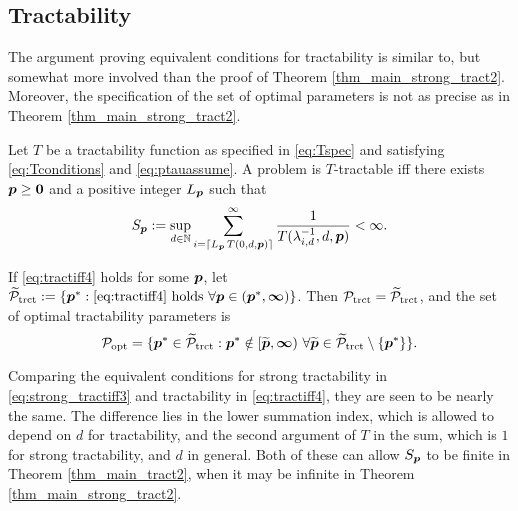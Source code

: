 \documentclass[11pt,a4paper]{article}
\begin{document}
\subsection{Tractability} \label{sec:tractability}


The argument proving equivalent conditions for tractability is similar to, but somewhat more involved than the proof of Theorem \ref{thm_main_strong_tract2}.  Moreover, the specification of the set of optimal parameters is not as precise as in Theorem \ref{thm_main_strong_tract2}.

\begin{theorem}\label{thm_main_tract2}
Let $T$ be a tractability function as specified in \eqref{eq:Tspec} and satisfying \eqref{eq:Tconditions} and \eqref{eq:ptauassume}.  A problem is $T$-tractable iff there exists $\boldsymbol{p}\ge \boldsymbol{0}$ and a positive integer $L_{\boldsymbol{p}}$ such that
\begin{equation} \label{eq:tractiff4}
     S_{\boldsymbol{p}}:=\sup_{d \in \mathbb{N}}
     \sum_{i = \lceil L_{\boldsymbol{p}}\, T(0,d,\boldsymbol{p}) \rceil}^\infty \frac{1}{T(\lambda^{-1}_{i,d},d,\boldsymbol{p})}< \infty.
\end{equation}

If \eqref{eq:tractiff4} holds for some $\boldsymbol{p}$, let $\widetilde{\mathcal{P}}_{\textup{trct}} : = \{\boldsymbol{p}^* : \eqref{eq:tractiff4} \text{ holds }\forall \boldsymbol{p} \in (\boldsymbol{p}^*,\boldsymbol{\infty}) \}$.
Then $\mathcal{P}_{\textup{trct}} = \widetilde{\mathcal{P}}_{\textup{trct}}$, and the set of optimal  tractability parameters is
\[
\mathcal{P}_{\textup{opt}} =
\{\boldsymbol{p}^* \in \widetilde{\mathcal{P}}_{\textup{trct}} :  \boldsymbol{p}^* \notin [\widetilde{\boldsymbol{p}},\boldsymbol{\infty}) \ \forall \widetilde{\boldsymbol{p}}\in  \widetilde{\mathcal{P}}_{\textup{trct}} \setminus \{\boldsymbol{p}^*\} \}.
\]

\end{theorem}

Comparing the equivalent conditions for strong tractability in \eqref{eq:strong_tractiff3} and tractability in \eqref{eq:tractiff4}, they are seen to be nearly the same.  The difference lies in the lower summation index, which is allowed to depend on $d$ for tractability, and the second argument of $T$ in the sum, which is $1$ for strong tractability, and $d$ in general.  Both of these can allow $S_{\boldsymbol{p}}$ to be finite in Theorem \ref{thm_main_tract2}, when it may be infinite in Theorem \ref{thm_main_strong_tract2}.
\end{document}
